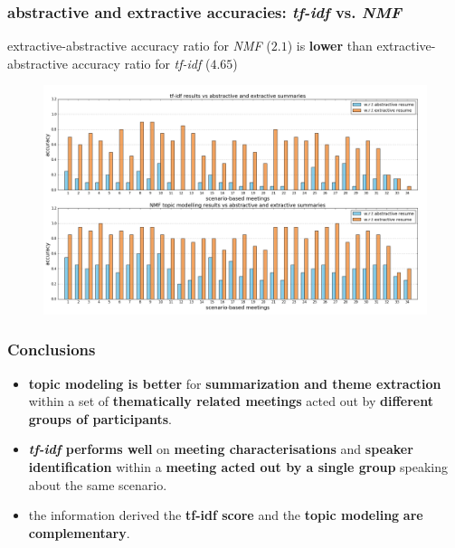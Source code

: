 \documentclass{beamer}
\newcommand{\tfidf}{\emph{tf-idf}}
\newcommand{\NMF}{\emph{NMF}}
\begin{document}
\begin{frame}[plain]
\frametitle{abstractive and extractive accuracies: \tfidf{} vs. \NMF{}}
extractive-abstractive accuracy ratio for \NMF{} ($\mathbf{2.1}$) is \textbf{lower} than extractive-abstractive accuracy ratio for \tfidf{} ($\mathbf{4.65}$)
\begin{figure}[!htb]
\centering
\includegraphics[width=12cm]{images/tfidf-nmf.png} %
\label{fig:tf-idf-scenario}
\end{figure}

\end{frame}


\begin{frame}%
\frametitle{Conclusions}
\begin{itemize}

\item \textbf{topic modeling is better} for \textbf{summarization and theme extraction} within a set of \textbf{thematically related meetings} acted out by \textbf{different groups of participants}.

\item \textbf{\tfidf{} performs well} on \textbf{meeting characterisations} and \textbf{speaker identification} within a \textbf{meeting acted out by a single group} speaking about the same scenario.

\item the information derived the \textbf{tf-idf score} and the \textbf{topic modeling} \textbf{are complementary}.
\end{itemize}

\end{frame}

\end{document}
